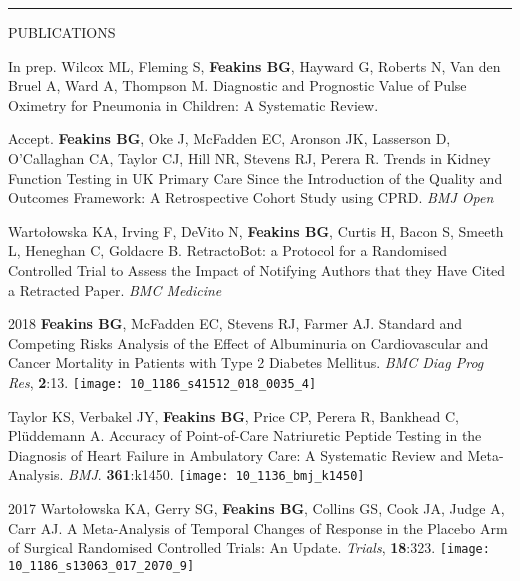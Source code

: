 \documentclass[10pt,a4paper]{article}
\begin{document}
\noindent\rule{\textwidth}{0.4pt}
\begin{cvlist}{PUBLICATIONS}
  
  \item[In prep.]
  Wilcox ML, Fleming S, \textbf{Feakins BG}, Hayward G, Roberts N, Van den Bruel A, Ward A, Thompson M. Diagnostic and Prognostic Value of Pulse Oximetry for Pneumonia in Children: A Systematic Review.
  
  \item[Accept.]
  \textbf{Feakins BG}, Oke J, McFadden EC, Aronson JK, Lasserson D, O'Callaghan CA, Taylor CJ, Hill NR, Stevens RJ, Perera R. Trends in Kidney Function Testing in UK Primary Care Since the Introduction of the Quality and Outcomes Framework: A Retrospective Cohort Study using CPRD. \textit{BMJ Open}
  
  \item[]
  Warto\l{}owska KA, Irving F, DeVito N, \textbf{Feakins BG}, Curtis H, Bacon S, Smeeth L, Heneghan C, Goldacre B. RetractoBot: a Protocol for a Randomised Controlled Trial to Assess the Impact of Notifying Authors that they Have Cited a Retracted Paper. \textit{BMC Medicine} 
  
  \item[2018]
  \textbf{Feakins BG}, McFadden EC, Stevens RJ, Farmer AJ. Standard and Competing Risks Analysis of the Effect of Albuminuria on Cardiovascular and Cancer Mortality in Patients with Type 2 Diabetes Mellitus. \textit{BMC Diag Prog Res}, \textbf{2}:13.  \texttt{[image: 10\_1186\_s41512\_018\_0035\_4]}
  
  \item[]
  Taylor KS, Verbakel JY, \textbf{Feakins BG}, Price CP, Perera R, Bankhead C, Pl\"uddemann A. Accuracy of Point-of-Care Natriuretic Peptide Testing in the Diagnosis of Heart Failure in Ambulatory Care: A Systematic Review and Meta-Analysis. \textit{BMJ}. \textbf{361}:k1450.  \texttt{[image: 10\_1136\_bmj\_k1450]}
  
  \item[2017]
  Warto\l{}owska KA, Gerry SG, \textbf{Feakins BG}, Collins GS, Cook JA, Judge A, Carr AJ. A Meta-Analysis of Temporal Changes of Response in the Placebo Arm of Surgical Randomised Controlled Trials: An Update. \textit{Trials}, \textbf{18}:323.  \texttt{[image: 10\_1186\_s13063\_017\_2070\_9]}
  

\end{cvlist}
\end{document}
